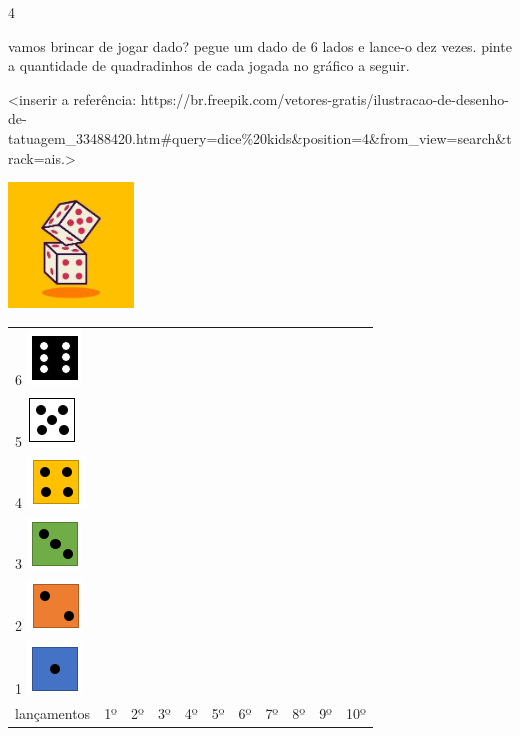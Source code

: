 \num{4}

vamos brincar de jogar dado? pegue um dado de 6 lados e lance-o dez
vezes. pinte a quantidade de quadradinhos de cada jogada no gráfico
a seguir.

\textless{}inserir a referência:
https://br.freepik.com/vetores-gratis/ilustracao-de-desenho-de-tatuagem\_33488420.htm\#query=dice\%20kids\&position=4\&from\_view=search\&track=ais.\textgreater{}

\includegraphics[width=1.31250in,height=1.31250in]{media/image97.jpg}

\begin{longtable}[]{@{}lllllllllll@{}}
\toprule
6 \includegraphics[width=0.56258in,height=0.57300in]{media/image98.png}
& & & & & & & & & &\tabularnewline
5 \includegraphics[width=0.53132in,height=0.55216in]{media/image99.png}
& & & & & & & & & &\tabularnewline
4 \includegraphics[width=0.61467in,height=0.53132in]{media/image100.png}
& & & & & & & & & &\tabularnewline
3 \includegraphics[width=0.56258in,height=0.53132in]{media/image101.png}
& & & & & & & & & &\tabularnewline
2 \includegraphics[width=0.57300in,height=0.54174in]{media/image102.png}
& & & & & & & & & &\tabularnewline
1 \includegraphics[width=0.58341in,height=0.55216in]{media/image103.png}
& & & & & & & & & &\tabularnewline
lançamentos & 1º & 2º & 3º & 4º & 5º & 6º & 7º & 8º & 9º &
10º\tabularnewline
\bottomrule
\end{longtable}

